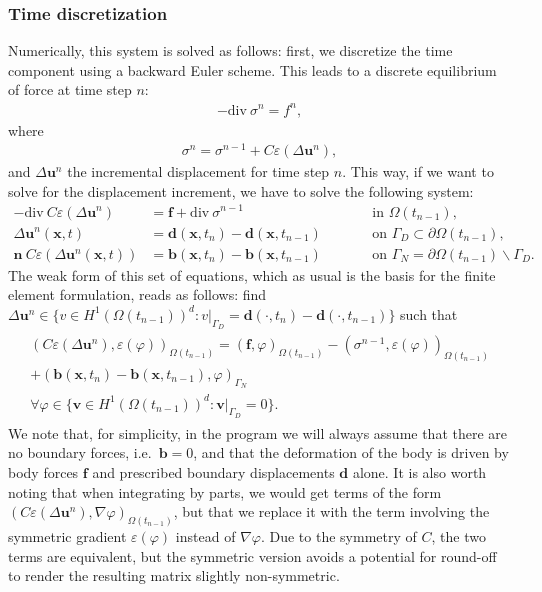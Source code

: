 \documentclass{article}
\renewcommand{\vec}[1]{\mathbf{#1}}
\renewcommand{\div}{\mathrm{div}\ }
\begin{document}
\subsubsection*{Time discretization}

Numerically, this system is solved as follows: first, we discretize
the time component using a backward Euler scheme. This leads to a
discrete equilibrium of force at time step $n$:
\begin{gather}
  -\div \sigma^n = f^n,
\end{gather}
where
\begin{gather}
  \sigma^n = \sigma^{n-1} + C \varepsilon (\Delta \vec u^n),
\end{gather}
and $\Delta \vec u^n$ the incremental displacement for time step
$n$. This way, if we want to solve for the displacement increment, we
have to solve the following system:
\begin{align}
  - \div  C \varepsilon(\Delta\vec u^n) &= \vec f + \div \sigma^{n-1}
  &&\text{in $\Omega(t_{n-1})$},
  \\
  \Delta \vec u^n(\vec x,t) &= \vec d(\vec x,t_n) - \vec d(\vec x,t_{n-1})
  \qquad
  &&\text{on $\Gamma_D\subset\partial\Omega(t_{n-1})$},
  \\
  \vec n \ C \varepsilon(\Delta \vec u^n(\vec x,t)) &= \vec b(\vec x,t_n)-\vec b(\vec x,t_{n-1})
  \qquad
  &&\text{on $\Gamma_N=\partial\Omega(t_{n-1})\backslash\Gamma_D$}.
\end{align}
The weak form of this set of equations, which as usual is the basis for the
finite element formulation, reads as follows: find $\Delta \vec u^n \in
\{v\in H^1(\Omega(t_{n-1}))^d: v|_{\Gamma_D}=\vec d(\cdot,t_n) - \vec d(\cdot,t_{n-1})\}$
such that
\begin{gather}
  \begin{split}
  \label{eq:linear-system}
  (C \varepsilon(\Delta\vec u^n), \varepsilon(\varphi) )_{\Omega(t_{n-1})}
  = 
  (\vec f, \varphi)_{\Omega(t_{n-1})}
  -(\sigma^{n-1},\varepsilon(\varphi))_{\Omega(t_{n-1})}
  \\
  +(\vec b(\vec x,t_n)-\vec b(\vec x,t_{n-1}), \varphi)_{\Gamma_N}
  \\
  \forall \varphi \in \{\vec v\in H^1(\Omega(t_{n-1}))^d: \vec
  v|_{\Gamma_D}=0\}.     
  \end{split}
\end{gather}
We note that, for simplicity, in the program we will always assume that there
are no boundary forces, i.e.~$\vec b = 0$, and that the deformation of the
body is driven by body forces $\vec f$ and prescribed boundary displacements
$\vec d$ alone. It is also worth noting that when integrating by parts, we
would get terms of the form $(C \varepsilon(\Delta\vec u^n), \nabla \varphi
)_{\Omega(t_{n-1})}$, but that we replace it with the term involving the
symmetric gradient $\varepsilon(\varphi)$ instead of $\nabla\varphi$. Due to
the symmetry of $C$, the two terms are equivalent, but the symmetric version
avoids a potential for round-off to render the resulting matrix slightly
non-symmetric.
\end{document}
